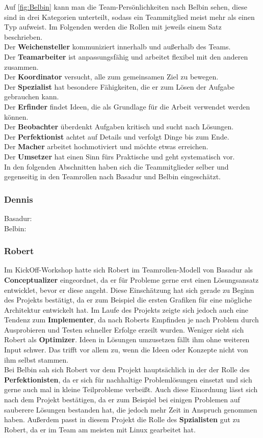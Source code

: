 \documentclass[a4paper,12pt,headsepline]{scrartcl}
\begin{document}
		Auf \cref{fig:Belbin} kann man die Team-Persönlichkeiten nach Belbin sehen, diese sind in drei Kategorien unterteilt, sodass ein Teammitglied meist mehr als einen Typ aufweist. Im Folgenden werden die Rollen mit jeweils einem Satz beschrieben.\\
		Der \textbf{Weichensteller} kommuniziert innerhalb und außerhalb des Teams.\\
		Der \textbf{Teamarbeiter} ist anpassungsfähig und arbeitet flexibel mit den anderen zusammen.\\
		Der \textbf{Koordinator} versucht, alle zum gemeinsamen Ziel zu bewegen.\\
		Der \textbf{Spezialist} hat besondere Fähigkeiten, die er zum Lösen der Aufgabe gebrauchen kann.\\
		Der \textbf{Erfinder} findet Ideen, die als Grundlage für die Arbeit verwendet werden können.\\
		Der \textbf{Beobachter} überdenkt Aufgaben kritisch und sucht nach Lösungen.\\
		Der \textbf{Perfektionist} achtet auf Details und verfolgt Dinge bis zum Ende.\\
		Der \textbf{Macher} arbeitet hochmotiviert und möchte etwas erreichen.\\
		Der \textbf{Umsetzer} hat einen Sinn fürs Praktische und geht systematisch vor.\\
		
		In den folgenden Abschnitten haben sich die Teammitglieder selber und gegenseitig in den Teamrollen nach Basadur und Belbin eingeschätzt.
		\subsubsection{Dennis}
		Basadur: \\
		Belbin: 
\subsubsection{Robert}
Im KickOff-Workshop hatte sich Robert im Teamrollen-Modell von Basadur als \textbf{Conceptualizer} eingeordnet, da er für Probleme gerne erst einen Lösungsansatz entwicklet, bevor er diese angeht. Diese Einschätzung hat sich gerade zu Beginn des Projekts bestätigt, da er zum Beispiel die ersten Grafiken für eine mögliche Architektur entwickelt hat. Im Laufe des Projekts zeigte sich jedoch auch eine Tendenz zum \textbf{Implementer}, da nach Roberts Empfinden je nach Problem durch Ausprobieren und Testen schneller Erfolge erzeilt wurden. Weniger sieht sich Robert als \textbf{Optimizer}. Ideen in Lösungen umzusetzen fällt ihm ohne weiteren Input schwer. Das trifft vor allem zu, wenn die Ideen oder Konzepte nicht von ihm selbst stammen.\\
Bei Belbin sah sich Robert vor dem Projekt hauptsächlich in der der Rolle des \textbf{Perfektionisten}, da er sich für nachhaltige Problemlösungen einsetzt und sich gerne auch mal in kleine Teilprobleme verbeißt. Auch diese Einordnung lässt sich nach dem Projekt bestätigen, da er zum Beispiel bei einigen Problemen auf sauberere Lösungen bestanden hat, die jedoch mehr Zeit in Anspruch genommen haben. Außerdem passt in diesem Projekt die Rolle des \textbf{Spzialisten} gut zu Robert, da er im Team am meisten mit Linux gearbeitet hat.  
\end{document}
